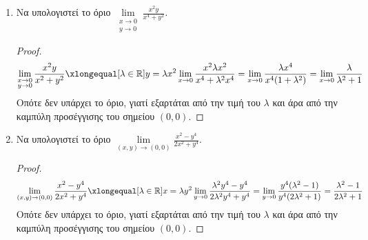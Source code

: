 \begin{examples}
\item {}
    \begin{enumerate}
        \item Να υπολογιστεί το όριο $ \lim\limits_{\substack{x\to 0 \\y \to 0}}
            \frac{x^{2}y}{x^{4}+y^{2}} $.

            \begin{proof}
                \[
                    \lim\limits_{\substack{x\to 0 \\y \to 0}} 
                    \frac{x^{2}y}{x^{2}+y^{2}} 
                    \xlongequal[\lambda \in \mathbb{R}]{y= \lambda x^{2}} 
                    \lim_{x \to 0} \frac{x^{2} \lambda x^{2}}
                    {x^{4}+\lambda^{2}x^{4}} = \lim_{x\to 0} 
                    \frac{\lambda x^{4}}{x^{4}(1+\lambda ^{2})} = 
                    \lim_{x \to 0} \frac{\lambda}{\lambda ^{2}+1} 
                \] 
                Οπότε δεν υπάρχει το όριο, γιατί εξαρτάται από την τιμή του $ \lambda $ 
                και άρα από την καμπύλη προσέγγισης του σημείου $ (0,0) $.
            \end{proof}

        \item Να υπολογιστεί το όριο $ \lim\limits_{(x,y)\to (0, 0)} \frac{x^{2}-y^{4}}
            {2x^{2}+y^{4}} $. 

            \begin{proof}
                \[
                    \lim\limits_{(x,y)\to (0, 0)} \frac{x^{2}-y^{4}}
                    {2x^{2}+y^{4}} \xlongequal[\lambda \in \mathbb{R}]
                    {x= \lambda y^{2}} \lim_{y \to 0} 
                    \frac{\lambda ^{2}y^{4}-y^{4}}{2 \lambda ^{2}y^{4}+y^{4}} = 
                    \lim_{y \to 0} \frac{y^{4}(\lambda ^{2}-1)}
                    {y^{4}(2 \lambda ^{2}+1)} = 
                    \frac{\lambda ^{2}-1}{2 \lambda ^{2}+1} 
                \] 
                Οπότε δεν υπάρχει το όριο, γιατί εξαρτάται από την τιμή του $ \lambda $ 
                και άρα από την καμπύλη προσέγγισης του σημείου $ (0,0) $.
            \end{proof}
    \end{enumerate}
\end{examples}

